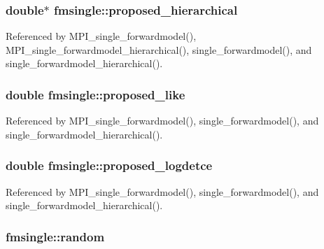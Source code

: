 \subsubsection[{\texorpdfstring{proposed\+\_\+hierarchical}{proposed_hierarchical}}]{\setlength{\rightskip}{0pt plus 5cm}double$\ast$ fmsingle\+::proposed\+\_\+hierarchical}\hypertarget{structfmsingle_a920535078a203fc1c06c04b0c370ab26}{}\label{structfmsingle_a920535078a203fc1c06c04b0c370ab26}


Referenced by M\+P\+I\+\_\+single\+\_\+forwardmodel(), M\+P\+I\+\_\+single\+\_\+forwardmodel\+\_\+hierarchical(), single\+\_\+forwardmodel(), and single\+\_\+forwardmodel\+\_\+hierarchical().

\subsubsection[{\texorpdfstring{proposed\+\_\+like}{proposed_like}}]{\setlength{\rightskip}{0pt plus 5cm}double fmsingle\+::proposed\+\_\+like}\hypertarget{structfmsingle_a91bacb67e5d416c9210619c950f1cbb2}{}\label{structfmsingle_a91bacb67e5d416c9210619c950f1cbb2}


Referenced by M\+P\+I\+\_\+single\+\_\+forwardmodel(), single\+\_\+forwardmodel(), and single\+\_\+forwardmodel\+\_\+hierarchical().

\subsubsection[{\texorpdfstring{proposed\+\_\+logdetce}{proposed_logdetce}}]{\setlength{\rightskip}{0pt plus 5cm}double fmsingle\+::proposed\+\_\+logdetce}\hypertarget{structfmsingle_a6f5f9b059e8099d77d4ad5c1ba0d9ebb}{}\label{structfmsingle_a6f5f9b059e8099d77d4ad5c1ba0d9ebb}


Referenced by M\+P\+I\+\_\+single\+\_\+forwardmodel(), single\+\_\+forwardmodel(), and single\+\_\+forwardmodel\+\_\+hierarchical().

\subsubsection[{\texorpdfstring{random}{random}}]{ fmsingle\+::random}\hypertarget{structfmsingle_aabc852b5e142570044ef6ac8803158ef}{}\label{structfmsingle_aabc852b5e142570044ef6ac8803158ef}


